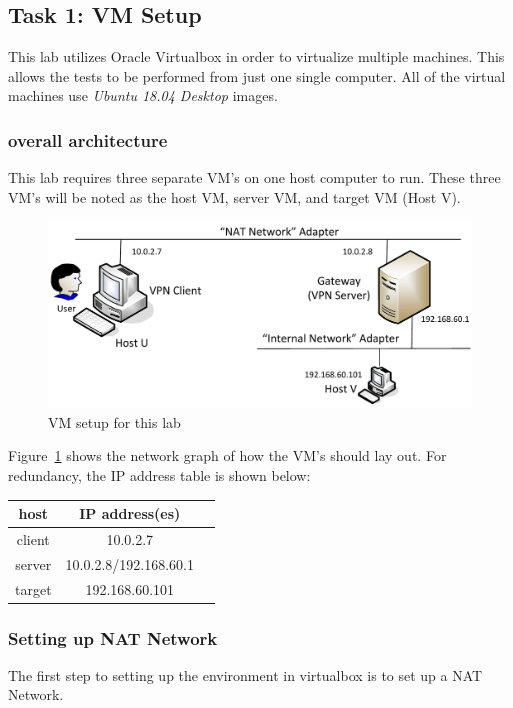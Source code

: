 \documentclass[12pt]{article}
\begin{document}
\subsection{Task 1: VM Setup}
This lab utilizes Oracle Virtualbox in order to virtualize multiple machines. This allows the tests to be performed from just one single computer. All of the virtual machines use \emph{Ubuntu 18.04 Desktop} images.
\subsubsection{overall architecture}
This lab requires three separate VM's on one host computer to run. These three VM's will be noted as the host VM, server VM, and target VM (Host V).
\begin{figure}[H]
    \begin{center}
        \includegraphics[scale=0.35]{t1_1.png}
    \end{center}{}
    \caption{VM setup for this lab}
    \label{fig:t1_1}
\end{figure}

Figure~\ref{fig:t1_1} shows the network graph of how the VM's should lay out. For redundancy, the IP address table is shown below:

\begin{center}
\begin{tabular}{ |c|c|c| } 
 \hline
 host & IP address(es) \\ 
 \hline
 client & 10.0.2.7  \\ 
 server & 10.0.2.8/192.168.60.1  \\ 
 target & 192.168.60.101 \\
 \hline
\end{tabular}
\end{center}

\subsubsection{Setting up NAT Network}
    The first step to setting up the environment in virtualbox is to set up a NAT Network.
    
\end{document}
